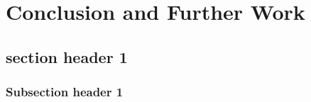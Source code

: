 \chapter{Conclusion and Further Work}


\section{section header 1}

\subsection{Subsection header 1}
